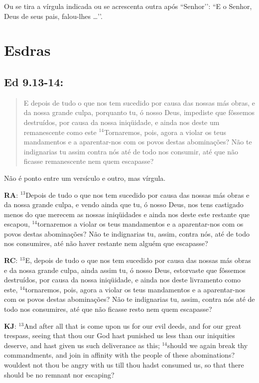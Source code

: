Ou se tira a vírgula indicada ou se acrescenta outra após ``Senhor’’: ``E o Senhor, Deus de seus pais, falou-lhes \ldots’’.

\section{Esdras}
\subsection*{Ed 9.13-14:} 
\begin{quote}
    \small
E depois de tudo o que nos tem sucedido por causa das nossas más obras, e da nossa grande culpa, porquanto tu, ó nosso Deus, impediste que fôssemos destruídos, por causa da nossa iniqüidade, e ainda nos deste um remanescente como este $^{\mathrm{14}}$Tornaremos, pois, agora a violar os teus mandamentos e a aparentar-nos com os povos destas abominações? Não te indignarias tu assim contra nós até de todo nos consumir, até que não ficasse remanescente nem quem escapasse?
\end{quote}

Não é ponto entre um versículo e outro, mas vírgula.

\textbf{RA}: $^{\mathrm{13}}$Depois de tudo o que nos tem sucedido por causa
das nossas más obras e da nossa grande culpa, e vendo ainda que tu, ó
nosso Deus, nos tens castigado menos do que merecem as nossas
iniqüidades e ainda nos deste este restante que escapou,
$^{\mathrm{14}}$tornaremos a violar os teus mandamentos e a
aparentar-nos com os povos destas abominações? Não te indignarias tu,
assim, contra nós, até de todo nos consumires, até não haver restante
nem alguém que escapasse?

\textbf{RC}: $^{\mathrm{13}}$E, depois de tudo o que nos tem sucedido por causa
das nossas más obras e da nossa grande culpa, ainda assim tu, ó nosso
Deus, estorvaste que fôssemos destruídos, por causa da nossa
iniqüidade, e ainda nos deste livramento como este,
$^{\mathrm{14}}$tornaremos, pois, agora a violar os teus mandamentos e
a aparentar-nos com os povos destas abominações? Não te indignarias
tu, assim, contra nós até de todo nos consumires, até que não ficasse
resto nem quem escapasse?

\textbf{KJ}: $^{\mathrm{13}}$And after all that is come upon us for our evil
deeds, and for our great trespass, seeing that thou our God hast
punished us less than our iniquities deserve, and hast given us such
deliverance as this; $^{\mathrm{14}}$should we again break thy
commandments, and join in affinity with the people of these
abominations? wouldest not thou be angry with us till thou hadst
consumed us, so that there should be no remnant nor escaping?

